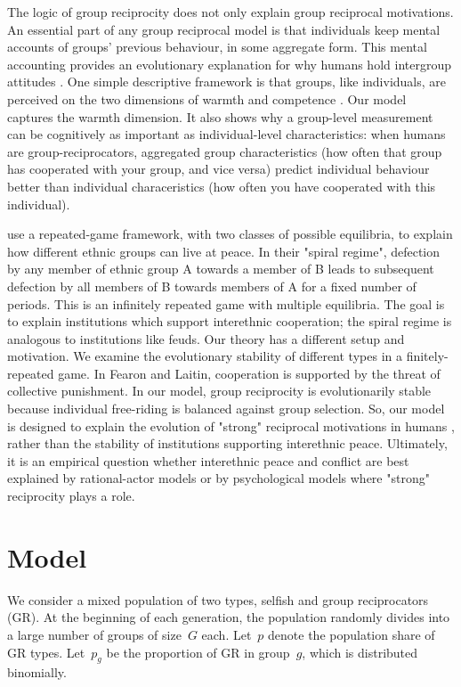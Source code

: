 \documentclass[12pt,a4paper]{article}
\begin{document}
The logic of group reciprocity does not only explain group reciprocal motivations.
An essential part of any group reciprocal model is that individuals keep mental 
accounts of groups' previous behaviour, in some aggregate form. This mental
accounting provides an evolutionary explanation for why humans hold intergroup 
attitudes \citep{brewer1985psychology,kurzban2001can}. One simple descriptive 
framework is that groups, like individuals, are perceived on the two dimensions of
warmth and competence \citep{fiske2007universal}. Our model captures
the warmth dimension. It also shows why a group-level measurement can be cognitively
as important as individual-level characteristics: when humans are group-reciprocators,
aggregated group characteristics (how often that group has cooperated
with your group, and vice versa) predict individual behaviour better than individual
characeristics (how often you have cooperated with this individual).

\citet{fearon1996explaining} use a repeated-game framework, with 
two classes of possible equilibria, to explain how
different ethnic groups can live at peace. In their "spiral regime", defection
by any member of ethnic group A towards a member of B leads to subsequent 
defection by all members of B towards members of A for a fixed number of periods.
This is an infinitely repeated game with multiple equilibria. The goal is to explain
institutions which support interethnic cooperation; the spiral regime is analogous
to institutions like feuds. Our theory has a different setup and motivation. 
We examine the evolutionary stability of different types in a finitely-repeated game. 
In Fearon and Laitin, cooperation is supported by the threat of collective 
punishment. In our model, group reciprocity is evolutionarily stable because 
individual free-riding is balanced against group selection. So, our model
is designed to explain the evolution of "strong" reciprocal
motivations in humans \citep{gintis2000strong}, rather than the 
stability of institutions supporting interethnic peace. Ultimately, it is an 
empirical question whether interethnic peace and conflict are best explained 
by rational-actor models or by psychological models where "strong" reciprocity 
plays a role.

\section{Model}

We consider a mixed population of two types, selfish and group reciprocators (GR). At the beginning of each generation, the population randomly divides into a large number of groups of size~$G$ each.
Let~$p$ denote the population share of GR types. 
Let~$p_g$ be the proportion of GR in group~$g$, which is distributed binomially.
\end{document}
